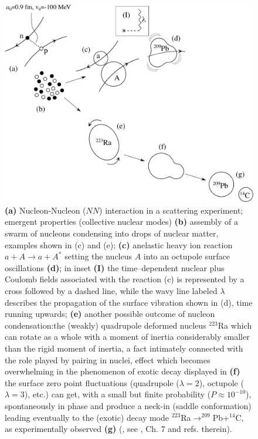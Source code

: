 \begin{figure}
	\centerline {
		\includegraphics*[width=16cm]{introduccion/figs/figpreface2x}
	}
	\caption{ \textbf{(a)} Nucleon-Nucleon ($NN$) interaction in a scattering experiment; emergent properties (collective nuclear modes) \textbf{(b)} assembly of a swarm of nucleons condensing into drops of nuclear matter, examples shown in (c) and (e); \textbf{(c)} anelastic heavy ion reaction $a+A\to a+A^*$ setting the nucleus $A$ into an octupole surface oscillations \textbf{(d)}; in inset \textbf{(I)} the time--dependent nuclear plus Coulomb fields associated with the reaction (c) is represented by a cross followed by a dashed line, while the wavy line labeled $\lambda$ describes the propagation of the surface vibration shown in (d), time running upwards; \textbf{(e)} another possible outcome of nucleon condensation:the (weakly) quadrupole deformed nucleus $^{223}$Ra which can rotate as a whole with a moment of inertia considerably smaller than the rigid moment of inertia, a fact intimately connected with the role played by pairing in nuclei, effect which becomes overwhelming in the phenomenon of exotic decay displayed in \textbf{(f)} the surface zero point fluctuations  (quadrupole ($\lambda=2$), octupole ($\lambda=3$), etc.) can get, with a small but finite probability ($P\approx10^{-10}$), spontaneously in phase and produce a neck-in (saddle conformation) leading eventually to the (exotic) decay mode  $^{223}$Ra$\to^{209}$Pb+$^{14}$C, as experimentally observed \textbf{(g)} (\cite{Rose:84}, see \cite{Brink:05}, Ch. 7 and refs. therein).}
	\label{fig1.0.2}
\end{figure}
